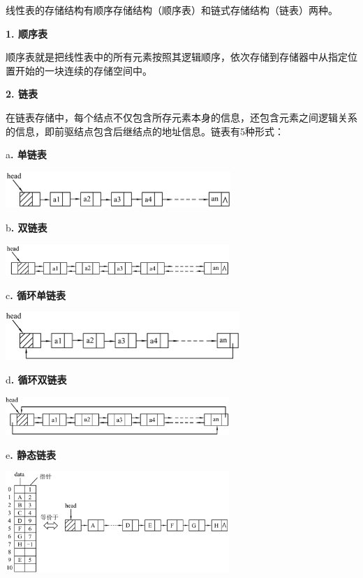 { }

{线性表的存储结构有{顺序存储结构}（顺序表）和{链式存储结构}（链表）两种。}

{\textbf{1. 顺序表}}

{顺序表就是把线性表中的所有元素按照其逻辑顺序，依次存储到存储器中从指定位置开始的一块{连续的存储空间中}。}

{\textbf{2. 链表}}

{在链表存储中，每个结点不仅包含所存元素本身的信息，还包含元素之间逻辑关系的信息，即前驱结点包含后继结点的地址信息。链表有5种形式：}

{a\textbf{. 单链表}}\textbf{}

\includegraphics[width=3.36458in,height=0.55208in]{png-jpeg-pics/C20E94AE04F8208A15667A05019B1E65.png}

{b\textbf{. 双链表}\\
}

\includegraphics[width=3.33333in,height=0.45833in]{png-jpeg-pics/7D7C423781159DA1E482604156DD615A.png}

{c\textbf{. 循环单链表}\\
}

\includegraphics[width=3.48958in,height=0.71875in]{png-jpeg-pics/A73BFA643AA8FB8519FED189FD23A39C.png}

{d\textbf{. 循环双链表}\\
}

\includegraphics[width=3.33333in,height=0.58333in]{png-jpeg-pics/7E10782F7D3284B6634F5CB34D06A188.png}

{e\textbf{. 静态链表}\\
}

\includegraphics[width=3.33333in,height=1.51042in]{png-jpeg-pics/DBE33BB1E0A5E477AF148176D1253920.png}
